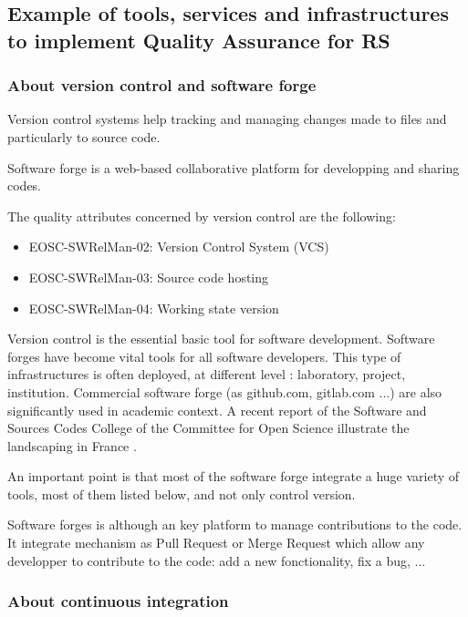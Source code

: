 \subsection{Example of tools, services and infrastructures to implement Quality Assurance for RS}


\subsubsection{About version control and software forge}

Version control systems help tracking and managing changes made to
files and particularly to source code.

Software forge is a web-based collaborative platform for developping
and sharing codes.

The quality attributes concerned by version control are the following:
\begin{itemize}
  \item EOSC-SWRelMan-02: Version Control System (VCS)
  \item EOSC-SWRelMan-03: Source code hosting
  \item EOSC-SWRelMan-04: Working state version
\end{itemize}

Version control is the essential basic tool for software development.
Software forges have become vital tools for all software developers.
This type of infrastructures is often deployed, at different level :
laboratory, project, institution. Commercial software forge (as
github.com, gitlab.com ...) are also significantly used in academic
context. A recent report of the Software and
Sources Codes College of the Committee for Open Science illustrate the
landscaping in France \cite{leberre:hal-04208924}.

An important point is that most of the software forge integrate a huge
variety of tools, most of them listed below, and not only control
version.

Software forges is although an key platform to manage contributions to
the code. It integrate mechanism as Pull Request or Merge Request
which allow any developper to contribute to the code: add a new
fonctionality, fix a bug, ... 

\subsubsection{About continuous integration}

